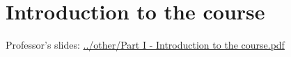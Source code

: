 \section{Introduction to the course}
Professor's slides: \url{../other/Part I - Introduction to the course.pdf}
